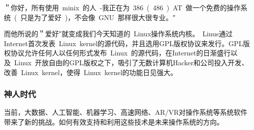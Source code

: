 ＂你好，所有使用 minix 的人 -我正在为 386 ( 486 ) AT 做一个免费的操作系统 ( 只是为了爱好 )，不会像 GNU 那样很大很专业。″

而他所说的＂爱好″就变成我们今天知道的 Linux操作系统内核。 Linus通过Internet首次发表 Linux kernel的源代码，并且选用GPL版权协议来发行。GPL版权协议允许任何人以任何形式发布 Linux 的源代码，在Internet的日渐盛行以及 Linux 开放自由的GPL版权之下，吸引了无数计算机Hacker和公司投入开发、改善 Linux kernel，使得 Linux kernel的功能日见强大。 

\subsubsection{神人时代}

当前，大数据、人工智能、机器学习、高速网络、AR/VR对操作系统等系统软件带来了新的挑战。如何有效支持和利用这些技术是未来操作系统的方向。


